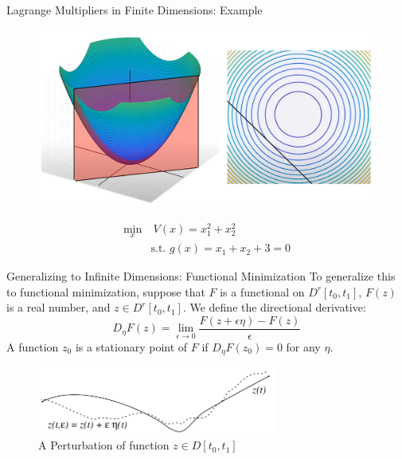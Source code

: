 \documentclass[10pt]{beamer}
\begin{document}
\begin{frame}{Lagrange Multipliers in Finite Dimensions: Example}
  \begin{figure}
      \centering
      \includegraphics[width=1\textwidth]{photos/4.png}
  \end{figure}
  \[
    \begin{aligned}
      \min_x & \ V(x)=x_1^2 + x_2^2 \\
      &\text{s.t. } g(x) = x_1 + x_2 + 3 = 0
    \end{aligned}
  \]
\end{frame}

\begin{frame}{Generalizing to Infinite Dimensions: Functional Minimization}
  To generalize this to functional minimization, suppose that $F$ is a functional on $D^{r}[t_0,t_1]$, $F(z)$ is a real number, and $z \in D^{r}[t_0,t_1]$.
  We define the directional derivative:
  \[
    D_\eta F(z) = \lim_{\epsilon \to 0} \frac{F(z + \epsilon \eta) - F(z)}{\epsilon}
  \]
  A function \( z_0 \) is a stationary point of \( F \) if \( D_\eta F(z_0) = 0 \) for any \( \eta \).
  \begin{figure}
    \centering
    \includegraphics[width=0.7\textwidth]{photos/2.png}
    \caption{A Perturbation of function \(z\in D[t_{0},t_{1}]\)}
  \end{figure}
\end{frame}
\end{document}
